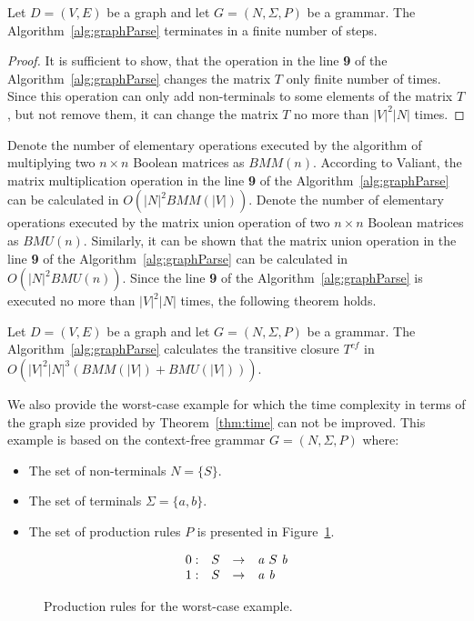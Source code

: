 \begin{mytheorem}\label{thm:finite}
 Let $D = (V,E)$ be a graph and let $G =(N,\Sigma,P)$ be a grammar. The Algorithm~\ref{alg:graphParse} terminates in a finite number of steps. 
\end{mytheorem}
\begin{proof}
It is sufficient to show, that the operation in the line \textbf{9} of the Algorithm~\ref{alg:graphParse} changes the matrix $T$ only finite number of times. Since this operation can only add non-terminals to some elements of the matrix $T$, but not remove them, it can change the matrix $T$ no more than $|V|^2|N|$ times.
\end{proof}

Denote the number of elementary operations executed by the algorithm of multiplying two $n \times n$ Boolean matrices as $BMM(n)$. According to Valiant, the matrix multiplication operation in the line \textbf{9} of the Algorithm~\ref{alg:graphParse} can be calculated in $O(|N|^2 BMM(|V|))$. Denote the number of elementary operations executed by the matrix union operation of two $n \times n$ Boolean matrices as $BMU(n)$. Similarly, it can be shown that the matrix union operation in the line \textbf{9} of the Algorithm~\ref{alg:graphParse} can be calculated in $O(|N|^2 BMU(n))$. Since the line \textbf{9} of the Algorithm~\ref{alg:graphParse} is executed no more than $|V|^2|N|$ times, the following theorem holds.

\begin{mytheorem}\label{thm:time}
 Let $D = (V,E)$ be a graph and let $G =(N,\Sigma,P)$ be a grammar. The Algorithm~\ref{alg:graphParse} calculates the transitive closure $T^{cf}$ in $O(|V|^2|N|^3(BMM(|V|) + BMU(|V|)))$.
\end{mytheorem}

We also provide the worst-case example for which the time complexity in terms of the graph size provided by Theorem~\ref{thm:time} can not be improved. This example is based on the context-free grammar $G = (N, \Sigma, P)$ where:
\begin{itemize}
	\item The set of non-terminals $N = \{S\}$.
	\item The set of terminals $\Sigma = \{a, b\}.$
	\item The set of production rules $P$ is presented in Figure~\ref{ProductionRulesWorsCaseExample}.
\end{itemize}

\begin{figure}[h]
	\[
	\begin{array}{rccl}
	0: & S & \rightarrow & \text{\textit{a}} \ S \ \text{\textit{b}} \\
	1: & S & \rightarrow & \text{\textit{a}} \ \text{\textit{b}} \\ 
	\end{array}
	\]
	\caption{Production rules for the worst-case example.}
	\label{ProductionRulesWorsCaseExample}
\end{figure}

